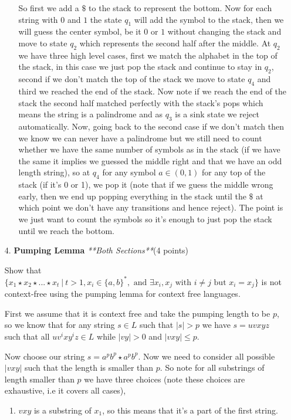 \documentclass[11pt]{article}
\begin{document}
\begin{enumerate}
\begin{itemize}
\begin{answer}
      So first we add a $\$$ to the stack to represent the bottom. Now for each string with $0$ and $1$ the state $q_{1}$ will add the symbol to the stack, then we will guess the center symbol, be it $0$ or $1$ without changing the stack and move to state $q_{2}$ which represents the second half after the middle. At $q_{2}$ we have three high level cases, first we match the alphabet in the top of the stack, in this case we just pop the stack and continue to stay in $q_{2}$, second if we don't match the top of the stack we move to state $q_4$ and third we reached the end of the stack. Now note if we reach the end of the stack the second half matched perfectly with the stack's pops which means the string is a palindrome and as $q_{3}$ is a sink state we reject automatically. Now, going back to the second case if we don't match then we know we can never have a palindrome but we still need to count whether we have the same number of symbols as in the stack (if we have the same it implies we guessed the middle right and that we have an odd length string), so at $q_{4}$ for any symbol $a \in (0, 1)$ for any top of the stack (if it's 0 or 1), we pop it (note that if we guess the middle wrong early, then we end up popping everything in the stack until the $\$$ at which point we don't have any transitions and hence reject). The point is we just want to count the symbols so it's enough to just pop the stack until we reach the bottom.



    \end{answer}
        
\end{itemize}

\item [4.] \textbf{Pumping Lemma} \textit{**Both Sections**}(4 points)

Show that $\{x_1\star x_2\star...\star x_t ~|~ t > 1, x_i \in \{a,b\}^*, \text{ and } \exists x_i,x_j \text{ with } i \neq j \text{ but } x_i = x_j \}$ is not context-free using the pumping lemma for context free languages.

\begin{answer}
  First we assume that it is context free and take the pumping length to be $p$, so we know that for any string $s \in L$ such that $|s| > p$ we have $s = uvxyz$ such that all $uv^{i}xy^{i}z \in L$ while $|vy| > 0$  and $|vxy| \le p$.
  \vspace{1em}
  
  Now choose our string $s = a^{p}b^{p} \star a^{p}b^{p}$. Now we need to consider all possible $|vxy|$ such that the length is smaller than $p$. So note for all substrings of length smaller than $p$ we have three choices (note these choices are exhaustive, i.e it covers all cases),
  \begin{enumerate}
    \item $vxy$ is a substring of $x_1$, so this means that it's a part of the first string.


\end{enumerate}
\end{answer}
\end{enumerate}
\end{document}
